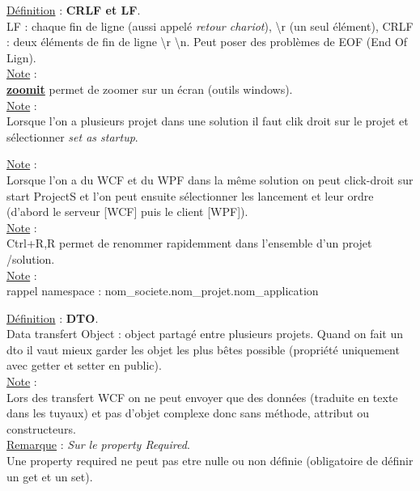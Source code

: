 \documentclass[a4paper,12pt,twoside]{article}
\newcommand{\urlcolor}{magenta}  %
\newcommand{\keycolor}{purple} %
\newcommand{\rem}[2]{\noindent\underline{Remarque} : \textit{#1}.\\ \indent #2}
\newcommand{\note}[1]{\noindent\underline{Note} : \\ \indent #1}
\newcommand{\defi}[2]{\noindent\underline{Définition} : \textbf{#1}.\\ \indent #2}
\newcommand{\keyref}[2]{\hypersetup{urlcolor=\keycolor} \href{#1}{\textbf{#2}}\hypersetup{urlcolor=\urlcolor}}
\begin{document}
\defi{CRLF et LF}{LF : chaque fin de ligne (aussi appelé \textit{retour chariot}), \textbackslash r (un seul élément), CRLF : deux éléments de fin de ligne \textbackslash r \textbackslash n. Peut poser des problèmes de EOF (End Of Lign).}\\

\note{\keyref{https://docs.microsoft.com/en-us/sysinternals/downloads/zoomit}{zoomit} permet de zoomer sur un écran (outils windows).}\\

\note{Lorsque l'on a plusieurs projet dans une solution il faut clik droit sur le projet et sélectionner \textit{set as startup}.}

\note{Lorsque l'on a du WCF et du WPF dans la même solution on peut click-droit sur start ProjectS et l'on peut ensuite sélectionner les lancement et leur ordre (d'abord le serveur [WCF] puis le client [WPF]).}\\

\note{Ctrl+R,R permet de renommer rapidemment dans l'ensemble d'un projet /solution.}\\

\note{rappel namespace : nom\_societe.nom\_projet.nom\_application}

\defi{DTO}{Data transfert Object : object partagé entre plusieurs projets. Quand on fait un dto il vaut mieux garder les objet les plus bêtes possible (propriété uniquement avec getter et setter en public).}\\

\note{Lors des transfert WCF on ne peut envoyer que des données (traduite en texte dans les tuyaux) et pas d'objet complexe donc sans méthode, attribut ou constructeurs.}\\

\rem{Sur le property Required}{Une property required ne peut pas etre nulle ou non définie (obligatoire de définir un get et un set).}\\

\newpage
\printglossary[type=\acronymtype]%
\glsaddallunused %
\printglossary[type = main,nonumberlist]%
\end{document}
